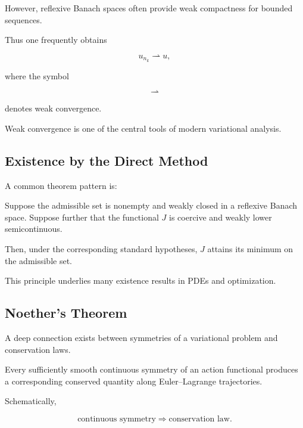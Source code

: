 However, reflexive Banach spaces often provide weak compactness for
bounded sequences.

Thus one frequently obtains

\[
\boxed{
u_{n_k}
\rightharpoonup
u,
}
\]

where the symbol

\[
\rightharpoonup
\]

denotes weak convergence.

Weak convergence is one of the central tools of modern variational
analysis.

\subsection{Existence by the Direct Method}
\label{subsec:existence-direct-method}

A common theorem pattern is:

\begin{theorem}
Suppose the admissible set is nonempty and weakly closed in a reflexive
Banach space. Suppose further that the functional \(J\) is coercive and
weakly lower semicontinuous.

Then, under the corresponding standard hypotheses, \(J\) attains its
minimum on the admissible set.
\end{theorem}

This principle underlies many existence results in PDEs and optimization.

\subsection{Noether's Theorem}
\label{subsec:noethers-theorem}

A deep connection exists between symmetries of a variational problem and
conservation laws.

\begin{theorem}
Every sufficiently smooth continuous symmetry of an action functional
produces a corresponding conserved quantity along Euler--Lagrange
trajectories.
\end{theorem}

Schematically,

\[
\boxed{
\text{continuous symmetry}
\Longrightarrow
\text{conservation law}.
}
\]

